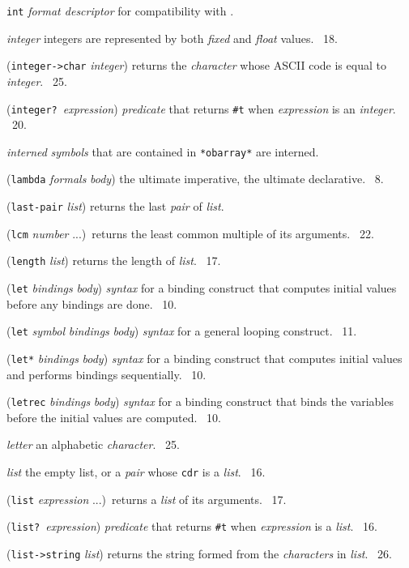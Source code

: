 \documentclass[10pt,twocolumn]{article}
\begin{document}
\texttt{int} \emph{format descriptor} for compatibility with \RRRRS.

\emph{integer} integers are represented by both \emph{fixed} and
\emph{float} values.  \RRRRRS~18.

(\texttt{integer->char} \emph{integer}) returns the \emph{character}
whose ASCII code is equal to \emph{integer}.  \RRRRRS~25.

(\texttt{integer?}\ \emph{expression}) \emph{predicate} that returns
\texttt{\#t} when \emph{expression} is an \emph{integer}.  \RRRRRS~20.

\emph{interned} \qquad \emph{symbols} that are contained in
\texttt{*obarray*} are interned.

(\texttt{lambda} \emph{formals} \emph{body}) the ultimate imperative,
the ultimate declarative.  \RRRRRS~8.

(\texttt{last-pair} \emph{list}) returns the last \emph{pair} of
\emph{list}.

(\texttt{lcm} \emph{number} ...)\ returns the least common multiple of
its arguments.  \RRRRRS~22.

(\texttt{length} \emph{list}) returns the length of \emph{list}.
\RRRRRS~17.

(\texttt{let} \emph{bindings} \emph{body}) \emph{syntax} for a binding
construct that computes initial values before any bindings are done.
\RRRRRS~10.

(\texttt{let} \emph{symbol} \emph{bindings} \emph{body}) \emph{syntax}
for a general looping construct. \RRRRRS~11.

(\texttt{let*} \emph{bindings} \emph{body}) \emph{syntax} for a
binding construct that computes initial values and performs bindings
sequentially.  \RRRRRS~10.

(\texttt{letrec} \emph{bindings} \emph{body}) \emph{syntax} for a
binding construct that binds the variables before the initial values
are computed.  \RRRRRS~10.

\emph{letter} an alphabetic \emph{character}.  \RRRRRS~25.

\emph{list} the empty list, or a \emph{pair} whose \texttt{cdr} is a
\emph{list}.  \RRRRRS~16.

(\texttt{list} \emph{expression} ...)\ returns a \emph{list} of its
arguments.  \RRRRRS~17.

(\texttt{list?}\ \emph{expression}) \emph{predicate} that returns
\texttt{\#t} when \emph{expression} is a \emph{list}.  \RRRRRS~16.

(\texttt{list->string} \emph{list}) returns the string formed from the
\emph{characters} in \emph{list}.  \RRRRRS~26.
\end{document}
